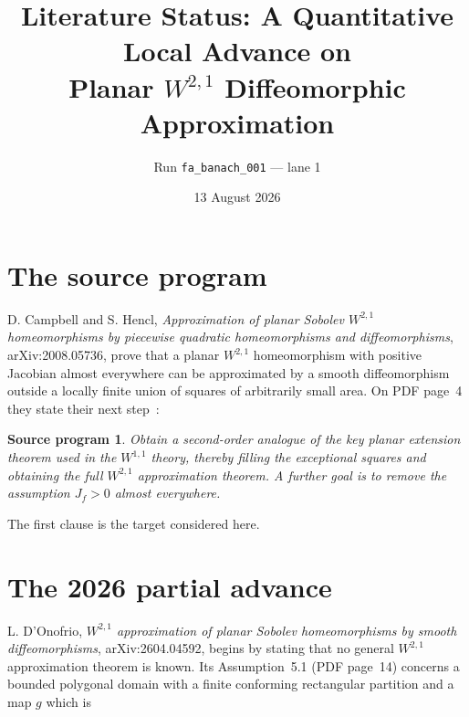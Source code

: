 \documentclass[11pt]{article}
\title{Literature Status: A Quantitative Local Advance on\\
Planar $W^{2,1}$ Diffeomorphic Approximation}
\author{Run \texttt{fa\_banach\_001} --- lane 1}
\date{13 August 2026}
\newtheorem*{sourceproblem}{Source program}
\begin{document}
\maketitle

\begin{center}
\end{center}

\section{The source program}

D. Campbell and S. Hencl, \emph{Approximation of planar Sobolev
$W^{2,1}$ homeomorphisms by piecewise quadratic homeomorphisms and
diffeomorphisms}, arXiv:2008.05736, prove that a planar
$W^{2,1}$ homeomorphism with positive Jacobian almost everywhere can be
approximated by a smooth diffeomorphism outside a locally finite union of
squares of arbitrarily small area.  On PDF page~4 they state their next
step~\cite{source}:

\begin{sourceproblem}
Obtain a second-order analogue of the key planar extension theorem used in
the $W^{1,1}$ theory, thereby filling the exceptional squares and obtaining
the full $W^{2,1}$ approximation theorem.  A further goal is to remove the
assumption $J_f>0$ almost everywhere.
\end{sourceproblem}

The first clause is the target considered here.

\section{The 2026 partial advance}

L. D'Onofrio, \emph{$W^{2,1}$ approximation of planar Sobolev
homeomorphisms by smooth diffeomorphisms}, arXiv:2604.04592, begins by
stating that no general $W^{2,1}$ approximation theorem is known.  Its
Assumption~5.1 (PDF page~14) concerns a bounded polygonal domain with a
finite conforming rectangular partition and a map $g$ which is
\end{document}
